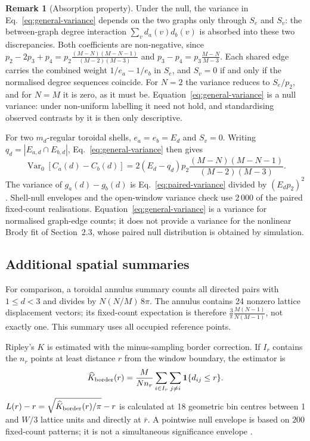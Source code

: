 \documentclass[final,1p,times,authoryear]{elsarticle}
\theoremstyle{definition}
\newtheorem{remark}{Remark}[section]
\begin{document}
\begin{remark}[Absorption property]\label{rem:absorption}
Under the null, the variance in Eq.~\eqref{eq:general-variance} depends on the
two graphs only through $S_e$ and $S_v$: the between-graph degree interaction
$\sum_v d_a(v)d_b(v)$ is absorbed into these two discrepancies. Both
coefficients are non-negative, since
$p_2-2p_3+p_4=p_2\tfrac{(M-N)(M-N-1)}{(M-2)(M-3)}$ and
$p_3-p_4=p_3\tfrac{M-N}{M-3}$. Each shared edge carries the combined weight
$1/e_a-1/e_b$ in $S_e$, and $S_v=0$ if and only if the normalised degree
sequences coincide. For $N=2$ the variance reduces to $S_e/p_2$, and for
$N=M$ it is zero, as it must be. Equation~\eqref{eq:general-variance} is a
null variance: under non-uniform labelling it need not hold, and standardising
observed contrasts by it is then only descriptive.
\end{remark}

For two $m_d$-regular toroidal shells, $e_a=e_b=E_d$ and $S_v=0$. Writing
$q_d=|E_{a,d}\cap E_{b,d}|$, Eq.~\eqref{eq:general-variance} then gives
\begin{equation}
\operatorname{Var}_0[C_a(d)-C_b(d)]
=2(E_d-q_d)p_2
\frac{(M-N)(M-N-1)}{(M-2)(M-3)}.
\label{eq:paired-variance}
\end{equation}
The variance of $g_a(d)-g_b(d)$ is Eq.~\eqref{eq:paired-variance} divided by
$(E_d p_2)^2$. Shell-null envelopes and the open-window variance check use
$2\,000$ of the paired fixed-count realisations.
Equation~\eqref{eq:general-variance} is a variance for normalised graph-edge
counts; it does not provide a variance for the nonlinear Brody fit of
Section~2.3, whose paired null distribution is obtained by simulation.

\subsection{Additional spatial summaries}

For comparison, a toroidal annulus summary counts all directed pairs with
$1\le d<3$ and divides by $N(N/M)\,8\pi$. The annulus contains 24 nonzero
lattice displacement vectors; its fixed-count expectation is therefore
$\frac{3}{\pi}\frac{M(N-1)}{N(M-1)}$, not exactly one. This summary uses all
occupied reference points.

Ripley's $K$ is estimated with the minus-sampling border correction. If
$I_r$ contains the $n_r$ points at least distance $r$ from the window
boundary, the estimator is
\begin{equation}
\widehat K_{\rm border}(r)=\frac{M}{N n_r}
\sum_{i\in I_r}\sum_{j\ne i}\mathbf{1}\{d_{ij}\le r\}.
\label{eq:border-k}
\end{equation}
$L(r)-r=\sqrt{\widehat K_{\rm border}(r)/\pi}-r$ is calculated at 18
geometric bin centres between 1 and $W/3$ lattice units and directly at
$\bar r$. A pointwise null envelope is based on $200$ fixed-count patterns;
it is not a simultaneous significance envelope
\citep{LOOSMORE-FORD-2006,MYLLYMAKI-2017}.
\end{document}
